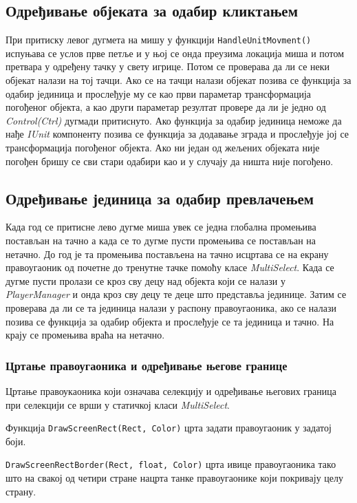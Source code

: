 \documentclass[11pt,a4paper]{article}
\begin{document}
\subsection{Одређивање објеката за одабир кликтањем}
При притиску левог дугмета на мишу у функцији \texttt{HandleUnitMovment()} испуњава се услов прве петље и у њој се онда преузима локација миша и потом претвара у  одређену тачку у свету игрице. Потом се проверава да ли се неки објекат налази на тој тачци. Ако се на тачци налази објекат позива се функција за одабир јединица и прослеђује му се као први параметар трансформација погођеног објекта, а као други параметар резултат провере да ли је једно од \emph{Control(Ctrl)} дугмади притиснуто. Ако функција за одабир јединица неможе да нађе \emph{IUnit} компоненту позива се функција за додавање зграда и прослеђује јој се трансформација погођеног објекта. Ако ни један од жељених објеката није погођен бришу се сви стари одабири као и у случају да ништа није погођено. 

\subsection{Одређивање јединица за одабир превлачењем}
Када год се притисне лево дугме миша увек се једна глобална промењива постављан на тачно а када се то дугме пусти промењива се постављан на нетачно. До год је та промењива постављена на тачно исцртава се на екрану правоугаоник од почетне до тренутне тачке помоћу класе \emph{MultiSelect}. Када се дугме пусти пролази се кроз сву децу над објекта који се налази у \emph{PlayerManager} и онда кроз сву децу те деце што представља јединице. Затим се проверава да ли се та јединица налази у распону правоугаоника, ако се налази позива се функција за одабир објекта и прослеђује се та јединица и тачно. На крају се промењива враћа на нетачно.

\subsubsection{Цртање правоугаоника и одређивање његове границе}
Цртање правоукаоника који означава селекцију и одређивање његових граница при селекцији се врши у статичкој класи \emph{MultiSelect}.

Функција \texttt{DrawScreenRect(Rect, Color)} црта задати правоугаоник у задатој боји.

\texttt{DrawScreenRectBorder(Rect, float, Color)} црта ивице правоугаоника тако што на свакој од четири стране нацрта танке правоугаонике који покривају целу страну.
\end{document}
